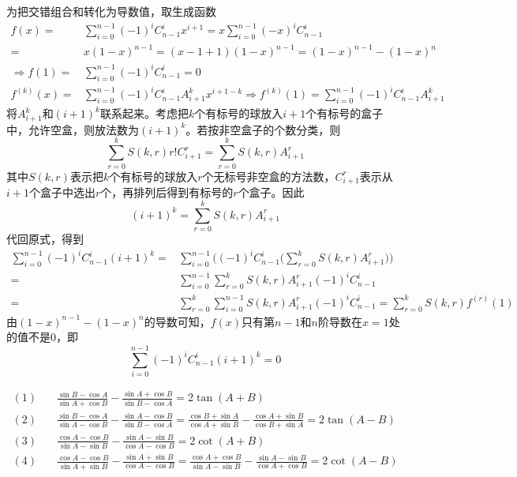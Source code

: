 \begin{solution}
    为把交错组合和转化为导数值，取生成函数
    \begin{align*}f(x)=&\displaystyle\sum_{i=0}^{n-1}(-1)^{i}C_{n-1}^{i}x^{i+1}
        =\displaystyle x\sum_{i=0}^{n-1}(-x)^{i}C_{n-1}^{i}\\
        =&\displaystyle x(1-x)^{n-1}
        =(x-1+1)(1-x)^{n-1}
        =(1-x)^{n-1}-(1-x)^n\\
    \Rightarrow f(1)=&\displaystyle\sum_{i=0}^{n-1}(-1)^{i}C_{n-1}^{i}=0\\
     f^{(k)}(x)=&\displaystyle\sum_{i=0}^{n-1}(-1)^{i}C_{n-1}^{i}A_{i+1}^{k}x^{i+1-k}\Rightarrow
     f^{(k)}(1)=\displaystyle\sum_{i=0}^{n-1}(-1)^{i}C_{n-1}^{i}A_{i+1}^{k}
    \end{align*}
    将$A_{i+1}^{k}$和${(i+1)}^{k}$联系起来。考虑把$k$个有标号的球放入$i+1$个有标号的盒子中，允许空盒，则放法数为${(i+1)}^{k}$。若按非空盒子的个数分类，则
    \[\sum_{r=0}^kS(k,r)r!C_{i+1}^r=\sum_{r=0}^kS(k,r)A_{i+1}^r\]
    其中$S(k,r)$表示把$k$个有标号的球放入$r$个无标号非空盒的方法数，$C_{i+1}^r$表示从$i+1$个盒子中选出$r$个，再排列后得到有标号的$r$个盒子。因此
    \[(i+1)^{k}=\sum_{r=0}^kS(k,r)A_{i+1}^r
    \]
    代回原式，得到\begin{align*}
    \sum_{i=0}^{n-1}(-1)^{i}C_{n-1}^{i}(i+1)^k=&\sum_{i=0}^{n-1}\bigg((-1)^{i}C_{n-1}^{i}\bigg(\sum_{r=0}^kS(k,r)A_{i+1}^r\bigg)\bigg)\\=&\sum_{i=0}^{n-1}\sum_{r=0}^kS(k,r)A_{i+1}^r(-1)^{i}C_{n-1}^{i}\\=&\sum_{r=0}^k\sum_{i=0}^{n-1}S(k,r)A_{i+1}^r(-1)^{i}C_{n-1}^{i}=\sum_{r=0}^kS(k,r)f^{(r)}(1)
    \end{align*}
    由$(1-x)^{n-1}-(1-x)^n$的导数可知，$f(x)$只有第$n-1$和$n$阶导数在$x=1$处的值不是$0$，即
    \[\sum_{i=0}^{n-1}(-1)^{i}C_{n-1}^{i}(i+1)^k=0
    \]
\end{solution}
\begin{example}[证明]
    \vspace{-15pt}\begin{align*}
    (1)\quad&\frac{\sin B - \cos A}{\sin A + \cos B} - \frac{\sin A + \cos B}{\sin B - \cos A} = 2\tan(A+B)\\
    (2)\quad&\frac{\sin B - \cos A}{\sin A - \cos B} - \frac{\sin A - \cos B}{\sin B - \cos A} = \frac{\cos B + \sin A}{\cos A + \sin B} - \frac{\cos A + \sin B}{\cos B + \sin A} = 2\tan(A-B)\\
    (3)\quad&\frac{\cos A - \cos B}{\sin A - \sin B} - \frac{\sin A - \sin B}{\cos A - \cos B} = 2\cot(A+B)\\
    (4)\quad&\frac{\cos A - \cos B}{\sin A + \sin B} - \frac{\sin A + \sin B}{\cos A - \cos B} = \frac{\cos A + \cos B}{\sin A - \sin B} - \frac{\sin A - \sin B}{\cos A + \cos B} = 2\cot(A-B)\end{align*}
\end{example}
